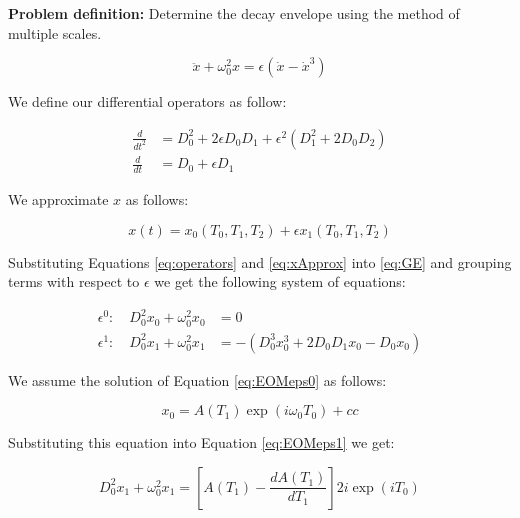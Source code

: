 \documentclass[14pt, a4paper]{extreport}
\begin{document}
\textbf{Problem definition:} Determine the decay envelope using the method of multiple scales.

%
\begin{equation}\label{eq:GE}
	\ddot{x} + \omega_0^2 x = \epsilon \left( \dot{x} - \dot{x}^3 \right)
\end{equation}
%

We define our differential operators as follow:

%
\begin{subequations}\label{eq:operators}
\begin{align}
	\frac{d}{dt^2} &= D_0^2 + 2 \epsilon D_0 D_1 + \epsilon^2 					\left(D_1^2 + 2 D_0 D_2\right)
	\\
	\frac{d}{dt} &= D_0 + \epsilon D_1
\end{align}
\end{subequations}
%

We approximate $x$ as follows:

%
\begin{equation}\label{eq:xApprox}
	x(t) = x_0 (T_0, T_1, T_2) + 
	       \epsilon x_1 (T_0, T_1, T_2)
\end{equation}
%

Substituting Equations \eqref{eq:operators} and \eqref{eq:xApprox} into \eqref{eq:GE} and grouping terms with respect to $\epsilon$ we get the following system of equations:

%
\begin{subequations}\label{eq:EOMeps}
\begin{align}
	\epsilon^0 : \quad D_{0}^{2} x_{0} + \omega_{0}^{2} x_{0} &= 0
	\label{eq:EOMeps0}
	\\
	\epsilon^1 : \quad D_{0}^{2} x_{1} + \omega_{0}^{2} x_{1} &= -
				 \left(
				 D_0^3 x_0^3 + 
				 2 D_{0} D_{1} x_{0} - 
				 D_0 x_0
				 \right)
	\label{eq:EOMeps1}
\end{align}
\end{subequations}
%

We assume the solution of Equation \eqref{eq:EOMeps0} as follows:

%
\begin{equation}\label{eq:x0}
	x_0 = A(T_1) \exp \left( i\omega_0 T_0 \right) + cc
\end{equation}
%

Substituting this equation into Equation \eqref{eq:EOMeps1} we get:

%
\begin{equation}
	D_{0}^{2} x_{1} + \omega_{0}^{2} x_{1} =
	\left[
	A(T_1) - \frac{dA(T_1)}{dT_1}
	\right]
	2i \exp \left( iT_0 \right)
\end{equation}
%
\end{document}
